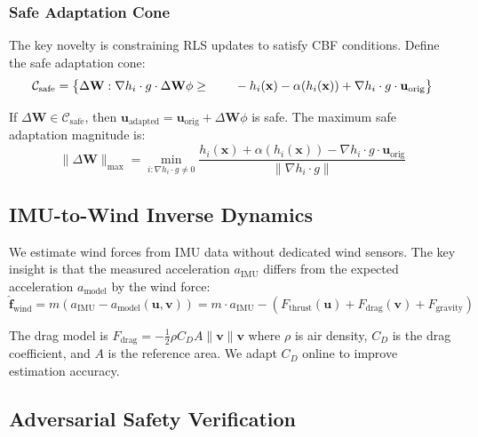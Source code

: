 \documentclass[12pt,a4paper,twocolumn]{article}
\newcommand{\cC}{\mathcal{C}}
\newcommand{\vect}[1]{\mathbf{#1}}
\newcommand{\mat}[1]{\mathbf{#1}}
\begin{document}
\subsubsection{Safe Adaptation Cone}
The key novelty is constraining RLS updates to satisfy CBF conditions. Define the safe adaptation cone:
\begin{equation}
    \cC_{\text{safe}} = \bigl\{\Delta\mat{W} : \nabla h_i \cdot g \cdot \Delta\mat{W}\phi \geq \notag\\
    \qquad -h_i(\vect{x}) - \alpha(h_i(\vect{x})) + \nabla h_i \cdot g \cdot \vect{u}_{\text{orig}}\bigr\}
    \label{eq:safe_cone}
\end{equation}

If $\Delta\mat{W} \in \cC_{\text{safe}}$, then $\vect{u}_{\text{adapted}} = \vect{u}_{\text{orig}} + \Delta\mat{W}\phi$ is safe. The maximum safe adaptation magnitude is:
\begin{equation}
    \|\Delta\mat{W}\|_{\max} = \min_{i: \nabla h_i \cdot g \neq 0} \frac{h_i(\vect{x}) + \alpha(h_i(\vect{x})) - \nabla h_i \cdot g \cdot \vect{u}_{\text{orig}}}{\|\nabla h_i \cdot g\|}
    \label{eq:max_adaptation}
\end{equation}

\subsection{IMU-to-Wind Inverse Dynamics}
\label{sec:inverse_dynamics}

We estimate wind forces from IMU data without dedicated wind sensors. The key insight is that the measured acceleration $a_{\text{IMU}}$ differs from the expected acceleration $a_{\text{model}}$ by the wind force:
\begin{equation}
    \hat{\vect{f}}_{\text{wind}} = m(a_{\text{IMU}} - a_{\text{model}}(\vect{u}, \vect{v})) = m \cdot a_{\text{IMU}} - (F_{\text{thrust}}(\vect{u}) + F_{\text{drag}}(\vect{v}) + F_{\text{gravity}})
    \label{eq:wind_estimate}
\end{equation}

The drag model is $F_{\text{drag}} = -\frac{1}{2}\rho C_D A \|\vect{v}\|\vect{v}$ where $\rho$ is air density, $C_D$ is the drag coefficient, and $A$ is the reference area. We adapt $C_D$ online to improve estimation accuracy.

\subsection{Adversarial Safety Verification}
\label{sec:adversarial}
\end{document}
